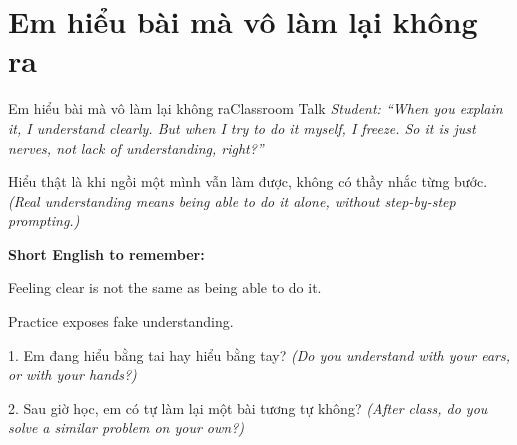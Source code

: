\section{Em hiểu bài mà vô làm lại không ra}
\begin{truyen}{Em hiểu bài mà vô làm lại không ra}{Classroom Talk}
\textit{Student: ``When you explain it, I understand clearly. But when I try to do it myself, I freeze. So it is just nerves, not lack of understanding, right?''}\\[4pt]



\end{truyen}

\begin{baihoc}
Hiểu thật là khi ngồi một mình vẫn làm được, không có thầy nhắc từng bước.
\textit{(Real understanding means being able to do it alone, without step-by-step prompting.)}
\end{baihoc}

\begin{ghinhoanh}
\textbf{Short English to remember:}

Feeling clear is not the same as being able to do it.

Practice exposes fake understanding.
\end{ghinhoanh}

\begin{tuhocnhanh}
1. Em đang hiểu bằng tai hay hiểu bằng tay? \textit{(Do you understand with your ears, or with your hands?)}

2. Sau giờ học, em có tự làm lại một bài tương tự không? \textit{(After class, do you solve a similar problem on your own?)}
\end{tuhocnhanh}
\ngancach

